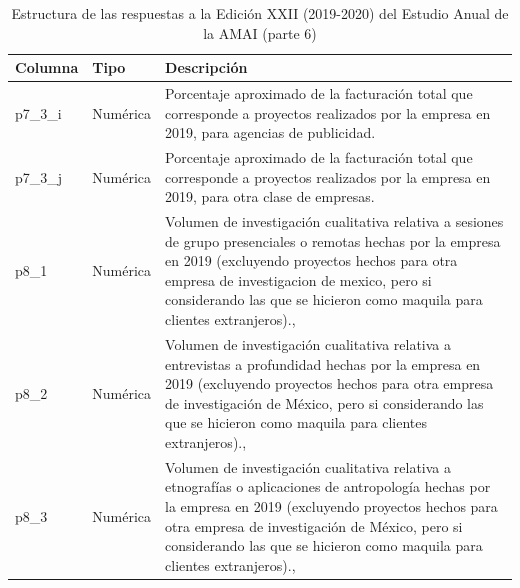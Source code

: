 \begin{table}[]
\caption{Estructura de las respuestas a la Edición XXII (2019-2020) del Estudio Anual de la AMAI (parte 6)}
\label{tab:raw2019_6}
\begin{tabular}{|l|l|l|}
\hline
Columna &
  Tipo &
  Descripción \\ \hline
p7\_3\_i & Numérica & \parbox[t]{9cm}{Porcentaje aproximado de la facturación total que corresponde a proyectos realizados por la empresa en 2019, para agencias de publicidad.}  \\ \hline
p7\_3\_j & Numérica & \parbox[t]{9cm}{Porcentaje aproximado de la facturación total que corresponde a proyectos realizados por la empresa en 2019, para otra clase de empresas.\vspace{0.1cm}} \\ \hline
p8\_1 &
  Numérica &
  \parbox[t]{9cm}{Volumen de investigación cualitativa relativa a sesiones de grupo presenciales o remotas hechas por la empresa en 2019 (excluyendo proyectos hechos para otra empresa de investigacion de mexico, pero si considerando las que se hicieron como maquila para clientes extranjeros).\vspace{0.1cm}}, \\ \hline
p8\_2 &
  Numérica &
  \parbox[t]{9cm}{Volumen de investigación cualitativa relativa a entrevistas a profundidad hechas por la empresa en 2019 (excluyendo proyectos hechos para otra empresa de investigación de México, pero si considerando las que se hicieron como maquila para clientes extranjeros).\vspace{0.1cm}}, \\ \hline
p8\_3 &
  Numérica &
  \parbox[t]{9cm}{Volumen de investigación cualitativa relativa a etnografías o aplicaciones de antropología hechas por la empresa en 2019 (excluyendo proyectos hechos para otra empresa de investigación de México, pero si considerando las que se hicieron como maquila para clientes extranjeros).\vspace{0.1cm}}, \\ \hline
\end{tabular}
\end{table}


